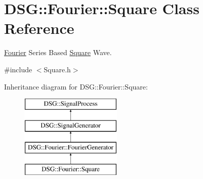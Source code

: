 \hypertarget{classDSG_1_1Fourier_1_1Square}{\section{D\-S\-G\-:\-:Fourier\-:\-:Square Class Reference}
\label{classDSG_1_1Fourier_1_1Square}
}


\hyperlink{namespaceDSG_1_1Fourier}{Fourier} Series Based \hyperlink{classDSG_1_1Fourier_1_1Square}{Square} Wave.  




{\ttfamily \#include $<$Square.\-h$>$}

Inheritance diagram for D\-S\-G\-:\-:Fourier\-:\-:Square\-:\begin{figure}[H]
\begin{center}
\leavevmode
\includegraphics[height=4.000000cm]{classDSG_1_1Fourier_1_1Square}
\end{center}
\end{figure}

